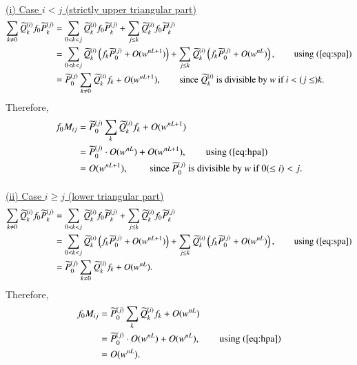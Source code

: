 \documentclass[12pt]{article}
\numberwithin{equation}{section}
\begin{document}
\paragraph{}
\underline{(i) Case $i<j$ (strictly upper triangular part)}
\begin{align*}
\sum_{k \neq 0} \widetilde{Q}_k^{(i)} f_0 \widetilde{P}_k^{(j)}
&= \sum_{0 <  k <j  }
\widetilde{Q}_k^{(i)} f_0\widetilde{P}_k^{(j)}
+
\sum_{j \leq k}
\widetilde{Q}_k^{(i)} f_0 \widetilde{P}_k^{(j)}
\\
&=
\sum_{0 < k <j  }
\widetilde{Q}_k^{(i)} \left(f_k \widetilde{P}_0^{(j)} +O(w^{nL+1}) \right)
+
\sum_{j \leq k}
\widetilde{Q}_k^{(i)} \left( f_k \widetilde{P}_0^{(j)}+O(w^{nL}) \right),
\qquad 
\text{using (\ref{eq:spa})}
\\
&= \widetilde{P}_0^{(j)} \sum_{k \neq 0} \widetilde{Q}_k^{(i)} f_k 
+O(w^{nL+1}),
\qquad \text{since $\widetilde{Q}_k^{(i)}$ is divisible by $w$ if $i<(j \leq ) k$.}
\end{align*}
Therefore,
\begin{align*}
f_0 M_{ij}
&=  \widetilde{P}_0^{(j)} \sum_k \widetilde{Q}_k^{(i)} f_k +O(w^{nL+1})
\\
&=  \widetilde{P}_0^{(j)} \cdot O(w^{nL}) +O(w^{nL+1}),
\qquad 
\text{using (\ref{eq:hpa})}
\\
&= O(w^{nL+1}), \qquad 
\text{
since $\widetilde{P}_0^{(j)}$ is divisible by $w$ if $0(\leq i) <j$.}
\end{align*}


\paragraph{}
\underline{(ii) Case $i \geq j$ (lower triangular part)}
\begin{align*}
\sum_{k \neq 0} \widetilde{Q}_k^{(i)} f_0 \widetilde{P}_k^{(j)}
&= \sum_{0<k<j}  \widetilde{Q}_k^{(i)} f_0 \widetilde{P}_k^{(j)}
+  \sum_{j \leq k}  \widetilde{Q}_k^{(i)} f_0 \widetilde{P}_k^{(j)}
\\
&=\sum_{0 < k <j  }
\widetilde{Q}_k^{(i)} \left(f_k \widetilde{P}_0^{(j)} +O(w^{nL+1}) \right)
+
\sum_{j \leq k}
\widetilde{Q}_k^{(i)} \left( f_k \widetilde{P}_0^{(j)}+O(w^{nL}) \right),
\qquad 
\text{using (\ref{eq:spa})}
\\ 
&= \widetilde{P}_0^{(j)}\sum_{k \neq 0} \widetilde{Q}_k^{(i)} 
f_k +O(w^{nL}).
\end{align*}
Therefore,
\begin{align*}
f_0 M_{ij}
&=
 \widetilde{P}_0^{(j)} \sum_{k} \widetilde{Q}_k^{(i)} f_k +O(w^{nL})
 \\
 &=\widetilde{P}_0^{(j)} \cdot O(w^{nL})+O(w^{nL}),
 \qquad 
\text{using (\ref{eq:hpa})}
\\
&=O(w^{nL}).
\end{align*}
\end{document}
